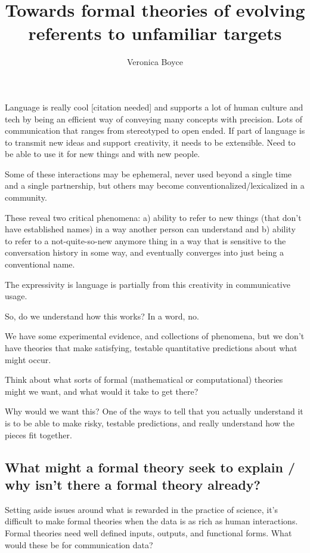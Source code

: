 \documentclass[]{article}
\title{Towards formal theories of evolving referents to unfamiliar targets}
\author{Veronica Boyce}
\begin{document}
	
	\maketitle
	
	
	Language is really cool [citation needed] and supports a lot of human culture and tech by being an efficient way of conveying many concepts with precision. Lots of communication that ranges from stereotyped to open ended. If part of language is to transmit new ideas and support creativity, it needs to be extensible. Need to be able to use it for new things and with new people. 
	
	Some of these interactions may be ephemeral, never used beyond a single time and a single partnership, but others may become conventionalized/lexicalized in a community. 
	
	These reveal two critical phenomena: a) ability to refer to new things (that don't have established names) in a way another person can understand and b) ability to refer to a not-quite-so-new anymore thing in a way that is sensitive to the conversation history in some way, and eventually converges into just being a conventional name. 
	
	The expressivity is language is partially from this creativity in communicative usage. 
	
	So, do we understand how this works? In a word, no. 
	
	We have some experimental evidence, and collections of phenomena, but we don't have theories that make satisfying, testable quantitative predictions about what might occur. 
	
	Think about what sorts of formal (mathematical or computational) theories might we want, and what would it take to get there? 
	
	Why would we want this? One of the ways to tell that you actually understand it is to be able to make risky, testable predictions, and really understand how the pieces fit together. 
	
	\subsection{What might a formal theory seek to explain / why isn't there a formal theory already?} Setting aside issues around what is rewarded in the practice of science, it's difficult to make formal theories when the data is as rich as human interactions. Formal theories need well defined inputs, outputs, and functional forms. What would these be for communication data? 
	
\end{document}
